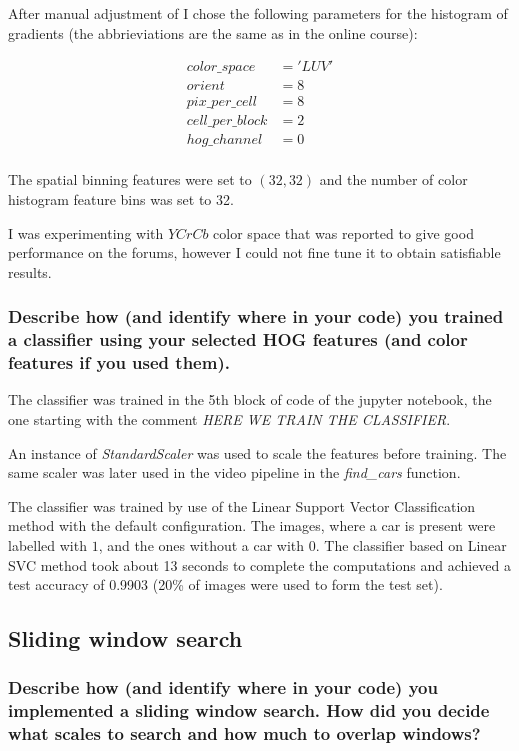 \documentclass[a4paper,10pt]{article}
\begin{document}
After manual adjustment of 
I chose the following parameters for the histogram of gradients (the abbrieviations are the same as in the online course):

\begin{align*}
color\_space &= 'LUV' \\
orient &= 8 \\
pix\_per\_cell &= 8 \\
cell\_per\_block &= 2 \\
hog\_channel &= 0 \\
\end{align*}

The spatial binning features were set to $(32,32)$
and the number of color histogram feature bins was set to 32.

I was experimenting with $YCrCb$ color space that was reported to give good performance on the forums,
however I could not fine tune it to obtain satisfiable results.

\subsubsection{Describe how (and identify where in your code) you trained a classifier using your selected HOG features (and color features if you used them).}

The classifier was trained in the 5th block of code of the jupyter notebook,
the one starting with the comment \emph{HERE WE TRAIN THE CLASSIFIER}.

An instance of \emph{StandardScaler} was used to scale the features before training.
The same scaler was later used in the video pipeline in the \emph{find\_cars} function.

The classifier was trained by use of the Linear Support Vector Classification method with the default configuration.
The images, where a car is present were labelled with $1$, and the ones without a car with $0$.
The classifier based on Linear SVC method took about 13 seconds to complete the computations and achieved a test accuracy of 0.9903
(20\% of images were used to form the test set).


\subsection{Sliding window search}

\subsubsection{Describe how (and identify where in your code) you implemented a sliding window search. How did you decide what scales to search and how much to overlap windows?}
\end{document}
